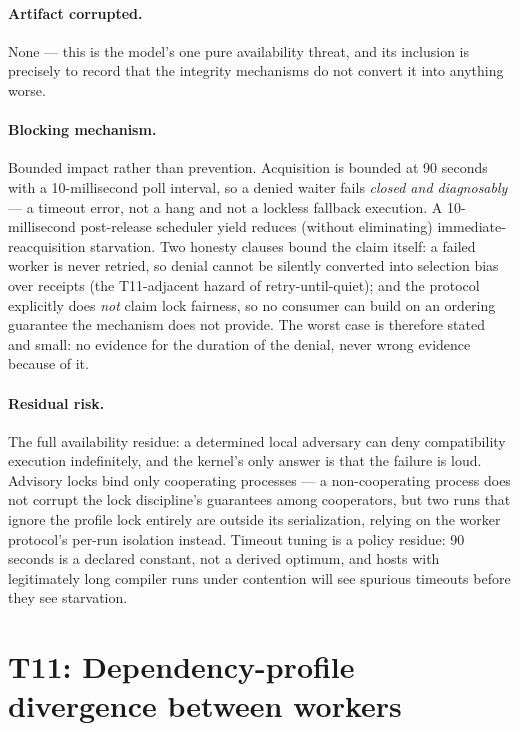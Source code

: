 \paragraph{Artifact corrupted.} None --- this is the model's one pure availability threat, and its inclusion is precisely to record that the integrity mechanisms do not convert it into anything worse.

\paragraph{Blocking mechanism.} Bounded impact rather than prevention. Acquisition is bounded at 90 seconds with a 10-millisecond poll interval, so a denied waiter fails \emph{closed and diagnosably} --- a timeout error, not a hang and not a lockless fallback execution. A 10-millisecond post-release scheduler yield reduces (without eliminating) immediate-reacquisition starvation. Two honesty clauses bound the claim itself: a failed worker is never retried, so denial cannot be silently converted into selection bias over receipts (the T11-adjacent hazard of retry-until-quiet); and the protocol explicitly does \emph{not} claim lock fairness, so no consumer can build on an ordering guarantee the mechanism does not provide. The worst case is therefore stated and small: no evidence for the duration of the denial, never wrong evidence because of it.

\paragraph{Residual risk.} The full availability residue: a determined local adversary can deny compatibility execution indefinitely, and the kernel's only answer is that the failure is loud. Advisory locks bind only cooperating processes --- a non-cooperating process does not corrupt the lock discipline's guarantees among cooperators, but two runs that ignore the profile lock entirely are outside its serialization, relying on the worker protocol's per-run isolation instead. Timeout tuning is a policy residue: 90 seconds is a declared constant, not a derived optimum, and hosts with legitimately long compiler runs under contention will see spurious timeouts before they see starvation.

\section{T11: Dependency-profile divergence between workers}\label{threat:t11}

